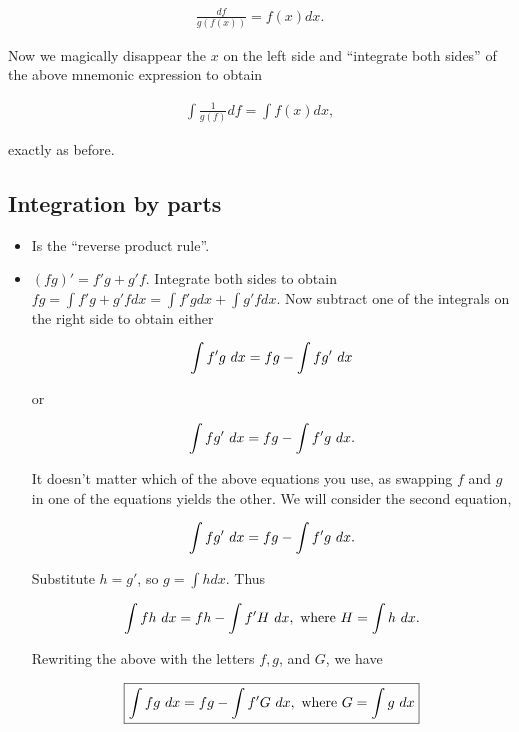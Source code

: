 \documentclass{article}
\begin{document}
\begin{align*}
    \frac{df}{g(f(x))} = f(x) dx.
\end{align*}

Now we magically disappear the $x$ on the left side and ``integrate both sides'' of the above mnemonic expression to obtain

\begin{align*}
    \int \frac{1}{g(f)} df = \int f(x) dx,
\end{align*}

exactly as before.

\subsection*{Integration by parts}

\begin{itemize}
    \item Is the ``reverse product rule''.
    \item $(fg)' = f'g + g'f$. Integrate both sides to obtain $fg = \int f'g + g'f dx = \int f'g dx + \int g'f dx$. Now subtract one of the integrals on the right side to obtain either
    
    \begin{align*}
        \int f'g \text{ } dx = fg - \int fg' \text{ } dx
    \end{align*}
    
    or
    
    \begin{align*}
        \int fg' \text{ } dx = fg - \int f'g \text{ } dx.
    \end{align*}
    
    It doesn't matter which of the above equations you use, as swapping $f$ and $g$ in one of the equations yields the other. We will consider the second equation,
    
    \begin{align*}
        \int fg' \text{ } dx = fg - \int f'g \text{ } dx.
    \end{align*}
    
    Substitute $h = g'$, so $g = \int h dx$. Thus
    
    \begin{align*}
        \int fh \text{ } dx = fh - \int f'H \text{ } dx, \text{ where } H = \int h \text{ } dx.
    \end{align*}
    
    Rewriting the above with the letters $f, g$, and $G$, we have
    
    \begin{align*}
        \boxed
        {
            \int fg \text{ } dx = fg - \int f'G \text{ } dx, \text{ where } G = \int g \text{ } dx
        }
    \end{align*}
    

\end{itemize}
\end{document}
